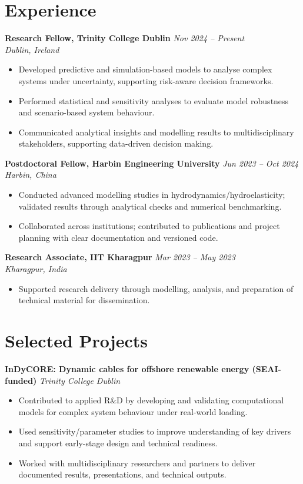 \documentclass[10pt,a4paper]{article}
\newcommand{\role}[3]{\textbf{#1} \hfill \textit{#2}\\ \textit{#3}}
\begin{document}
\section*{Experience}
\role{Research Fellow, Trinity College Dublin}{Nov 2024 -- Present}{Dublin, Ireland}
\begin{itemize}
  \item Developed predictive and simulation-based models to analyse complex systems under uncertainty, supporting risk-aware decision frameworks.
  \item Performed statistical and sensitivity analyses to evaluate model robustness and scenario-based system behaviour.
  \item Communicated analytical insights and modelling results to multidisciplinary stakeholders, supporting data-driven decision making.
\end{itemize}

\role{Postdoctoral Fellow, Harbin Engineering University}{Jun 2023 -- Oct 2024}{Harbin, China}
\begin{itemize}
  \item Conducted advanced modelling studies in hydrodynamics/hydroelasticity; validated results through analytical checks and numerical benchmarking.
  \item Collaborated across institutions; contributed to publications and project planning with clear documentation and versioned code.
\end{itemize}

\role{Research Associate, IIT Kharagpur}{Mar 2023 -- May 2023}{Kharagpur, India}
\begin{itemize}
  \item Supported research delivery through modelling, analysis, and preparation of technical material for dissemination.
\end{itemize}

\section*{Selected Projects}

\textbf{InDyCORE: Dynamic cables for offshore renewable energy (SEAI-funded)} \hfill \textit{Trinity College Dublin}
\begin{itemize}
  \item Contributed to applied R\&D by developing and validating computational models for complex system behaviour under real-world loading.
  \item Used sensitivity/parameter studies to improve understanding of key drivers and support early-stage design and technical readiness.
  \item Worked with multidisciplinary researchers and partners to deliver documented results, presentations, and technical outputs.
\end{itemize}
\end{document}
